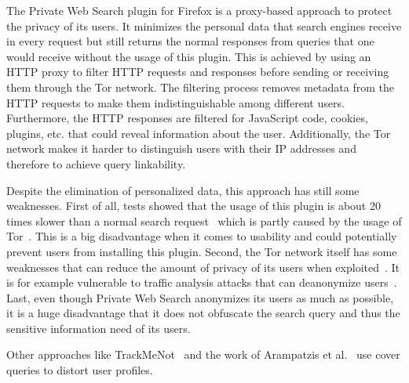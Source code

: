 The Private Web Search \cite{privateWebSearch} plugin for Firefox is a proxy-based approach to protect the privacy of its users. It minimizes the personal data that search engines receive in every request but still returns the normal responses from queries that one would receive without the usage of this plugin. This is achieved by using an HTTP proxy to filter HTTP requests and responses before sending or receiving them through the Tor network. The filtering process removes metadata from the HTTP requests to make them indistinguishable among different users. Furthermore, the HTTP responses are filtered for JavaScript code, cookies, plugins, etc. that could reveal information about the user. Additionally, the Tor network makes it harder to distinguish users with their IP addresses and therefore to achieve query linkability.\par
Despite the elimination of personalized data, this approach has still some weaknesses. First of all, tests showed that the usage of this plugin is about 20 times slower than a normal search request~\cite{privateWebSearch} which is partly caused by the usage of Tor~\cite{torSlow}. This is a big disadvantage when it comes to usability and could potentially prevent users from installing this plugin. Second, the Tor network itself has some weaknesses that can reduce the amount of privacy of its users when exploited~\cite{torWeakness, torNew}. It is for example vulnerable to traffic analysis attacks that can deanonymize users~\cite{torInternetSurveillanceWeakness}.
Last, even though Private Web Search anonymizes its users as much as possible, it is a huge disadvantage that it does not obfuscate the search query and thus the sensitive information need of its users.\par
Other approaches like TrackMeNot~\cite{trackmenot1, trackmenot2} and the work of Arampatzis et al.~\cite{arampatzis} use cover queries to distort user profiles.
